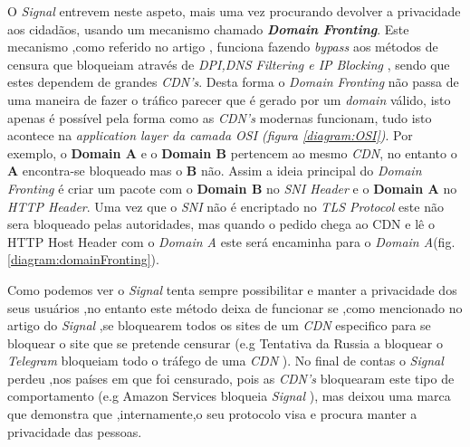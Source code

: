 O \textit{Signal} entrevem neste aspeto, mais uma vez procurando devolver a privacidade aos cidadãos, usando um mecanismo chamado \textbf{\textit{Domain Fronting}}. Este mecanismo ,como referido no artigo \cite{domainFrontingExplained}, funciona fazendo \textit{bypass} aos métodos de censura que bloqueiam através de \textit{DPI,DNS Filtering e IP Blocking} , sendo que estes dependem de grandes \textit{CDN's}. Desta forma o \textit{Domain Fronting} não passa de uma maneira de fazer o tráfico parecer que é gerado por um \textit{domain} válido, isto apenas é possível pela forma como as \textit{CDN's} modernas funcionam, tudo isto acontece na \textit{application layer da camada OSI (figura \ref{diagram:OSI})}. 
Por exemplo, o \textbf{Domain A} e o \textbf{Domain B} pertencem ao mesmo \textit{CDN}, no entanto o \textbf{A} encontra-se bloqueado mas o \textbf{B} não. Assim a ideia principal do \textit{Domain Fronting} é criar um pacote com o \textbf{Domain B} no \textit{SNI Header} e o \textbf{Domain A} no \textit{HTTP Header}. Uma vez que o \textit{SNI} não é encriptado no \textit{TLS Protocol} este não sera bloqueado pelas autoridades, mas quando o pedido chega ao CDN e lê o HTTP Host Header com o \textit{Domain A} este será encaminha para o \textit{Domain A}(fig. \ref{diagram:domainFronting}).

Como podemos ver o \textit{Signal} tenta sempre possibilitar e manter a privacidade dos seus usuários ,no entanto este método deixa de funcionar se ,como mencionado no artigo do \textit{Signal} \cite{signalDomainFronting},se bloquearem todos os sites de um \textit{CDN} especifico para se bloquear o site que se pretende censurar (e.g Tentativa da Russia a bloquear o \textit{Telegram} bloqueiam todo o tráfego de uma \textit{CDN} \cite{domainFrontingBlock} \cite{domainFrontingExplained} ). No final de contas o \textit{Signal} perdeu ,nos países em que foi censurado, pois as \textit{CDN's} bloquearam este tipo de comportamento (e.g Amazon Services bloqueia \textit{Signal} \cite{signalDomainFronting}), mas deixou uma marca que demonstra que ,internamente,o seu protocolo visa e procura manter a privacidade das pessoas.

